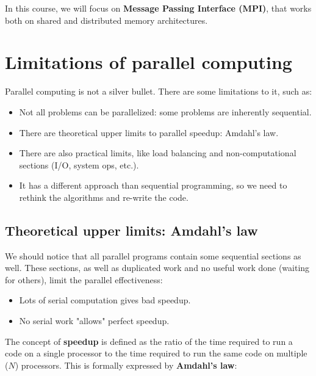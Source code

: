 In this course, we will focus on \textbf{Message Passing Interface (MPI)}, that works both
on shared and distributed memory architectures.

\section{Limitations of parallel computing}

Parallel computing is not a silver bullet. There are some limitations to it, such as:

\begin{itemize}
    \item Not all problems can be parallelized: some problems are inherently sequential.
    \item There are theoretical upper limits to parallel speedup: Amdahl's law.
    \item There are also practical limits, like load balancing and non-computational
    sections (I/O, system ops, etc.).
    \item It has a different approach than sequential programming, so we need to rethink
    the algorithms and re-write the code.
\end{itemize}

\subsection{Theoretical upper limits: Amdahl's law}

We should notice that all parallel programs contain some sequential sections as well.
These sections, as well as duplicated work and no useful work done (waiting for
others), limit the parallel effectiveness:

\begin{itemize}
    \item Lots of serial computation gives bad speedup.
    \item No serial work "allows" perfect speedup.
\end{itemize}

The concept of \textbf{speedup} is defined as the ratio of the time required to run a code
on a single processor to the time required to run the same code on multiple ($N$) processors.
This is formally expressed by \textbf{Amdahl's law}:

